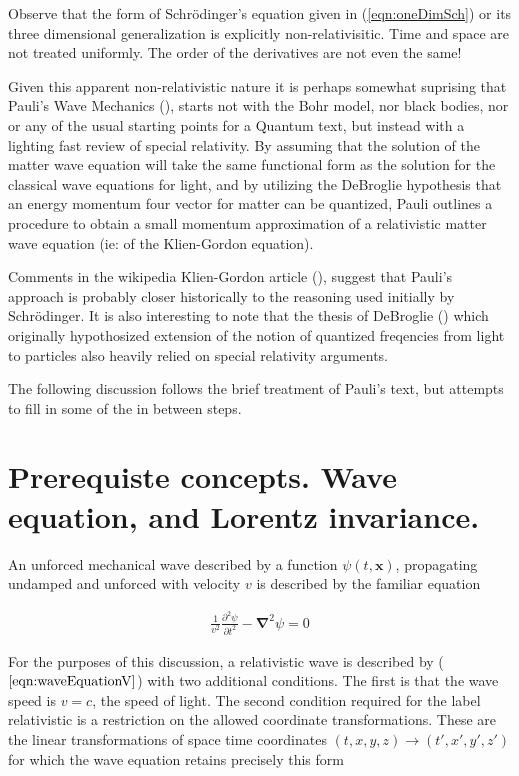 \documentclass[]{eliblog}
\newcommand{\Bx}[0]{\mathbf{x}}
\newcommand{\spacegrad}[0]{\boldsymbol{\nabla}}
\newcommand{\inv}[1]{\frac{1}{#1}}
\begin{document}
Observe that the form of Schr\"{o}dinger's equation given in (\ref{eqn:oneDimSch}) or its three dimensional generalization is
explicitly non-relativisitic.  Time and space are not treated uniformly.  The order of the derivatives are not
even the same!

Given this apparent non-relativistic nature it is perhaps somewhat suprising that Pauli's Wave Mechanics (\cite{pauli2000wm}),
starts not with the Bohr model, nor black bodies, nor or any of the usual starting points for a Quantum text,
but instead with a lighting fast review of special relativity.
By assuming that the solution of the matter wave equation will take the same functional form as the solution for the classical wave equations
for light, and
by utilizing the
DeBroglie hypothesis that an energy momentum four vector for matter can be quantized, Pauli 
outlines a procedure to obtain a small momentum approximation of a relativistic matter wave equation (ie: of the Klien-Gordon equation).

Comments in
the wikipedia Klien-Gordon article (\cite{wikiKG}), suggest that Pauli's approach is probably closer historically to
the reasoning used initially
by Schr\"{o}dinger.  It is also interesting to note that the thesis of DeBroglie (\cite{AFkracklauerDeBroglie}) which
originally hypothosized extension of the notion of quantized freqencies from light to particles 
also heavily relied on special relativity arguments.

The following discussion follows the brief treatment of Pauli's text, but attempts to fill in some of the in between steps.

\section{Prerequiste concepts.  Wave equation, and Lorentz invariance.}

An unforced mechanical wave described by a function $\psi(t,\Bx)$, propagating undamped and unforced with
velocity $v$ is described by the familiar equation

\begin{align}\label{eqn:waveEquationV}
\inv{v^2} \frac{\partial^2 \psi}{\partial t^2} - \spacegrad^2 \psi = 0
\end{align}

For the purposes of this discussion, a relativistic wave is described by ($\ref{eqn:waveEquationV}$) with two
additional conditions.  The first is that the wave speed is
$v = c$, the speed of light.  The second condition required for the label relativistic 
is a restriction on the allowed coordinate transformations.  These are the linear transformations
of space time coordinates
$(t,x,y,z) \rightarrow (t', x', y', z')$ for which the wave equation retains precisely this form
\end{document}
